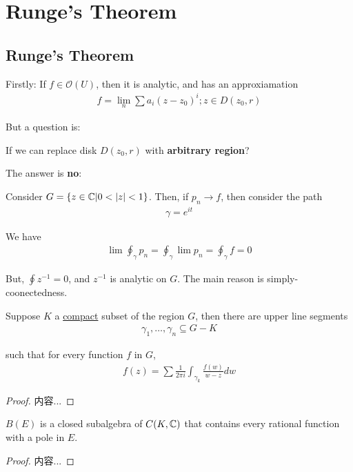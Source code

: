 \documentclass[Total.tex]{subfiles}
\begin{document}
		\section{Runge's Theorem}
			\subsection{Runge's Theorem}
			Firstly: If $f\in \mathcal{O}(U)$, then it is analytic, and has an approxiamation
			\begin{gather*}
				f=\lim_{n}\sum a_i (z-z_0)^i;z\in D(z_0,r)
			\end{gather*}
			
			But a question is:
			\begin{center}
				If we can replace disk $D(z_0,r)$ with \textbf{arbitrary region}?
			\end{center}
			
			The answer is \textbf{no}: 
			\begin{example}
				Consider $G=\{z\in \CC|0<|z|<1\}$. Then, if $p_n\rightarrow f$, then consider the path
				\begin{gather*}
					\gamma=e^{it}
				\end{gather*}
				
				We have 
				\begin{gather*}
					\lim \oint_\gamma p_n=\oint_\gamma \lim p_n=\oint_\gamma f=0
				\end{gather*}
				
				But, $\oint z^{-1}=0$, and $z^{-1}$ is analytic on $G$. The main reason is simply-coonectedness.
			\end{example}
			
			\begin{lemma}
				Suppose $K$ a \underline{compact} subset of the region $G$, then there are upper line segments
				\begin{gather*}
					\gamma_1,\dots,\gamma_n\subseteq G-K
				\end{gather*}
				
				such that for every function $f$ in $G$,
				\begin{gather*}
					f(z)=\sum \frac{1}{2\pi i}\int_{\gamma_k} \frac{f(w)}{w-z}dw
				\end{gather*}
			\end{lemma}
			\begin{proof}
				内容...
			\end{proof}
			
			\begin{lemma}
				$B(E)$ is a closed subalgebra of $C(K,\mathbb{C})$ that contains every rational function with a pole in $E$.
			\end{lemma}
			\begin{proof}
				内容...
			\end{proof}
			
\end{document}
